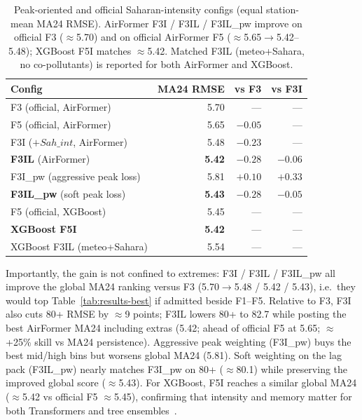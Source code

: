 \documentclass[11pt]{article}
\begin{document}
\begin{table}[H]
\centering
\caption{Peak-oriented and official Saharan-intensity configs (equal station-mean MA24 RMSE). AirFormer F3I / F3IL / F3IL\_pw improve on official F3 ($\approx$5.70) and on official AirFormer F5 ($\approx$5.65$\to$5.42--5.48); XGBoost F5I matches $\approx$5.42. Matched F3IL (meteo+Sahara, no co-pollutants) is reported for both AirFormer and XGBoost.}
\label{tab:peak-ext}
\small
\begin{tabular}{@{}lrrr@{}}
\toprule
Config & MA24 RMSE & vs F3 & vs F3I \\
\midrule
F3 (official, AirFormer) & 5.70 & --- & --- \\
F5 (official, AirFormer) & 5.65 & $-0.05$ & --- \\
F3I ($+Sah\_int$, AirFormer) & 5.48 & $-0.23$ & --- \\
\textbf{F3IL} (AirFormer) & \textbf{5.42} & $\mathbf{-0.28}$ & $-0.06$ \\
F3I\_pw (aggressive peak loss) & 5.81 & $+0.10$ & $+0.33$ \\
\textbf{F3IL\_pw} (soft peak loss) & \textbf{5.43} & $\mathbf{-0.28}$ & $-0.05$ \\
F5 (official, XGBoost) & 5.45 & --- & --- \\
\textbf{XGBoost F5I} & \textbf{5.42} & --- & --- \\
XGBoost F3IL (meteo+Sahara) & 5.54 & --- & --- \\
\bottomrule
\end{tabular}
\end{table}

Importantly, the gain is not confined to extremes: F3I / F3IL / F3IL\_pw all improve the global MA24 ranking versus F3 (5.70$\to$5.48 / 5.42 / 5.43), i.e.\ they would top Table~\ref{tab:results-best} if admitted beside F1--F5. Relative to F3, F3I also cuts 80+ RMSE by $\approx$9 points; F3IL lowers 80+ to 82.7 while posting the best AirFormer MA24 including extras (5.42; ahead of official F5 at 5.65; $\approx$+25\% skill vs MA24 persistence). Aggressive peak weighting (F3I\_pw) buys the best mid/high bins but worsens global MA24 (5.81). Soft weighting on the lag pack (F3IL\_pw) nearly matches F3I\_pw on 80+ ($\approx$80.1) while preserving the improved global score ($\approx$5.43). For XGBoost, F5I reaches a similar global MA24 ($\approx$5.42 vs official F5 $\approx$5.45), confirming that intensity and memory matter for both Transformers and tree ensembles~\cite{Wallek2024,Wang2023XGBoost}.
\end{document}
